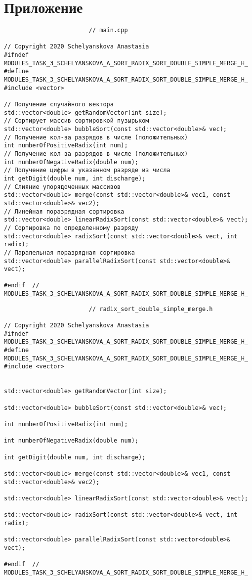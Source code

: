 \documentclass{report}
\begin{document}
\section*{Приложение}
\begin{lstlisting}
						// main.cpp

// Copyright 2020 Schelyanskova Anastasia
#ifndef MODULES_TASK_3_SCHELYANSKOVA_A_SORT_RADIX_SORT_DOUBLE_SIMPLE_MERGE_H_
#define MODULES_TASK_3_SCHELYANSKOVA_A_SORT_RADIX_SORT_DOUBLE_SIMPLE_MERGE_H_
#include <vector>

// Получение случайного вектора
std::vector<double> getRandomVector(int size);
// Сортирует массив сортировкой пузырьком
std::vector<double> bubbleSort(const std::vector<double>& vec);
// Получение кол-ва разрядов в числе (положительных)
int numberOfPositiveRadix(int num);
// Получение кол-ва разрядов в числе (положительных)
int numberOfNegativeRadix(double num);
// Получение цифры в указанном разряде из числа
int getDigit(double num, int discharge);
// Слияние упорядоченных массивов
std::vector<double> merge(const std::vector<double>& vec1, const std::vector<double>& vec2);
// Линейная поразрядная сортировка
std::vector<double> linearRadixSort(const std::vector<double>& vect);
// Сортировка по определенному разряду
std::vector<double> radixSort(const std::vector<double>& vect, int radix);
// Паралельная поразрядная сортировка
std::vector<double> parallelRadixSort(const std::vector<double>& vect);

#endif  // MODULES_TASK_3_SCHELYANSKOVA_A_SORT_RADIX_SORT_DOUBLE_SIMPLE_MERGE_H_
\end{lstlisting}
\begin{lstlisting}
						// radix_sort_double_simple_merge.h

// Copyright 2020 Schelyanskova Anastasia
#ifndef MODULES_TASK_3_SCHELYANSKOVA_A_SORT_RADIX_SORT_DOUBLE_SIMPLE_MERGE_H_
#define MODULES_TASK_3_SCHELYANSKOVA_A_SORT_RADIX_SORT_DOUBLE_SIMPLE_MERGE_H_
#include <vector>


std::vector<double> getRandomVector(int size);

std::vector<double> bubbleSort(const std::vector<double>& vec);

int numberOfPositiveRadix(int num);

int numberOfNegativeRadix(double num);

int getDigit(double num, int discharge);

std::vector<double> merge(const std::vector<double>& vec1, const std::vector<double>& vec2);

std::vector<double> linearRadixSort(const std::vector<double>& vect);

std::vector<double> radixSort(const std::vector<double>& vect, int radix);

std::vector<double> parallelRadixSort(const std::vector<double>& vect);

#endif  // MODULES_TASK_3_SCHELYANSKOVA_A_SORT_RADIX_SORT_DOUBLE_SIMPLE_MERGE_H_

\end{lstlisting}
\end{document}
